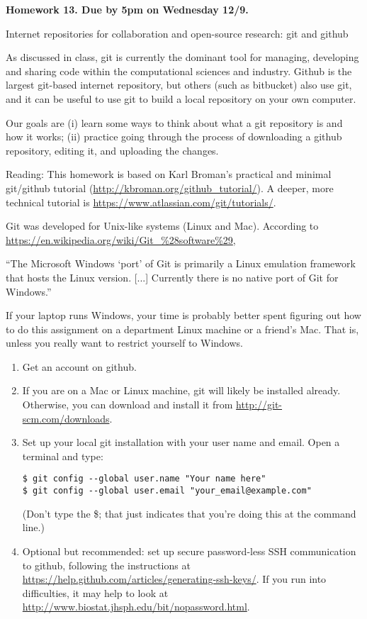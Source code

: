\documentclass[12pt]{article}
\begin{document}
\begin{center}\bf
Homework 13. Due by 5pm on Wednesday 12/9.

Internet repositories for collaboration and open-source research: git and github

\end{center}


As discussed in class, git is currently the dominant tool for managing, developing and sharing code within the computational sciences and industry. Github is the largest git-based internet repository, but others (such as bitbucket) also use git, and it can be useful to use git to build a local repository on your own computer. 

Our goals are (i) learn some ways to think about what a git repository is and how it works; (ii) practice going through the process of downloading a github repository, editing it, and uploading the changes.


Reading: This homework is based on Karl Broman's practical and minimal git/github tutorial (\url{http://kbroman.org/github_tutorial/}). A deeper, more technical tutorial is \url{https://www.atlassian.com/git/tutorials/}.

Git was developed for Unix-like systems (Linux and Mac). According to \url{https://en.wikipedia.org/wiki/Git_%28software%29},

``The Microsoft Windows `port' of Git is primarily a Linux emulation framework that hosts the Linux version. [...] Currently there is no native port of Git for Windows.''

If your laptop runs Windows, your time is probably better spent figuring out how to do this assignment on a department Linux machine or a friend's Mac.  That is, unless you really want to restrict yourself to Windows.

\begin{enumerate}
\item Get an account on github.
\item If you are on a Mac or Linux machine, git will likely be installed already. Otherwise, you can download and install it from \url{http://git-scm.com/downloads}.
\item Set up your local git installation with your user name and email. Open a terminal and type:

\begin{verbatim}
$ git config --global user.name "Your name here"
$ git config --global user.email "your_email@example.com"
\end{verbatim}
(Don’t type the \$; that just indicates that you’re doing this at the command line.)

\item Optional but recommended: set up secure password-less SSH communication to github, following the instructions at
\url{https://help.github.com/articles/generating-ssh-keys/}. If you run into difficulties, it may help to look at
\url{http://www.biostat.jhsph.edu/bit/nopassword.html}.

\end{enumerate}
\end{document}
